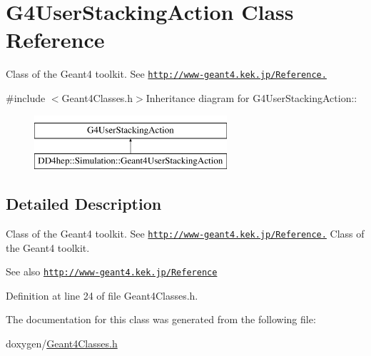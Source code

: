 \hypertarget{class_g4_user_stacking_action}{
\section{G4UserStackingAction Class Reference}
\label{class_g4_user_stacking_action}
}


Class of the Geant4 toolkit. See \href{http://www-geant4.kek.jp/Reference.}{\tt http://www-\/geant4.kek.jp/Reference.}  


{\ttfamily \#include $<$Geant4Classes.h$>$}Inheritance diagram for G4UserStackingAction::\begin{figure}[H]
\begin{center}
\leavevmode
\includegraphics[height=2cm]{class_g4_user_stacking_action}
\end{center}
\end{figure}


\subsection{Detailed Description}
Class of the Geant4 toolkit. See \href{http://www-geant4.kek.jp/Reference.}{\tt http://www-\/geant4.kek.jp/Reference.} Class of the Geant4 toolkit. \begin{DoxySeeAlso}{See also}
\href{http://www-geant4.kek.jp/Reference}{\tt http://www-\/geant4.kek.jp/Reference} 
\end{DoxySeeAlso}


Definition at line 24 of file Geant4Classes.h.

The documentation for this class was generated from the following file:\begin{DoxyCompactItemize}
\item 
doxygen/\hyperlink{_geant4_classes_8h}{Geant4Classes.h}\end{DoxyCompactItemize}
